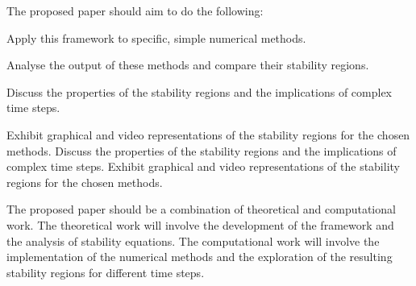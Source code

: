 \documentclass[a4paper, fleqn]{article}
\begin{document}
The proposed paper should aim to do the following:
    \item Apply this framework to specific, simple numerical methods.
    \item Analyse the output of these methods and compare their stability regions.
    \item Discuss the properties of the stability regions and the implications of complex time steps.
    \item Exhibit graphical and video representations of the stability regions for the chosen methods.
Discuss the properties of the stability regions and the implications of complex time steps.
Exhibit graphical and video representations of the stability regions for the chosen methods.


The proposed paper should be a combination of theoretical and computational work.
The theoretical work will involve the development of the framework and the analysis of stability equations.
The computational work will involve the implementation of the numerical methods and the exploration of the resulting stability regions for different time steps.



\end{document}
